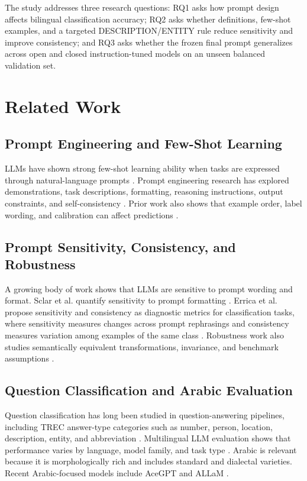 \documentclass[10pt,twocolumn]{article}
\begin{document}
The study addresses three research questions: RQ1 asks how prompt design affects bilingual classification accuracy; RQ2 asks whether definitions, few-shot examples, and a targeted DESCRIPTION/ENTITY rule reduce sensitivity and improve consistency; and RQ3 asks whether the frozen final prompt generalizes across open and closed instruction-tuned models on an unseen balanced validation set.
\section{Related Work}
\subsection{Prompt Engineering and Few-Shot Learning}
LLMs have shown strong few-shot learning ability when tasks are expressed through natural-language prompts \cite{brown2020language}. Prompt engineering research has explored demonstrations, task descriptions, formatting, reasoning instructions, output constraints, and self-consistency \cite{wei2022chain,kojima2022large,sahoo2024survey,white2023prompt,wang2023selfconsistency}. Prior work also shows that example order, label wording, and calibration can affect predictions \cite{zhao2021calibrate,lu2022fantastically}.
\subsection{Prompt Sensitivity, Consistency, and Robustness}
A growing body of work shows that LLMs are sensitive to prompt wording and format. Sclar et al. quantify sensitivity to prompt formatting \cite{sclar2024quantifying}. Errica et al. propose sensitivity and consistency as diagnostic metrics for classification tasks, where sensitivity measures changes across prompt rephrasings and consistency measures variation among examples of the same class \cite{errica2025wrong}. Robustness work also studies semantically equivalent transformations, invariance, and benchmark assumptions \cite{liang2023helm,ailem2024robustness}.
\subsection{Question Classification and Arabic Evaluation}
Question classification has long been studied in question-answering pipelines, including TREC answer-type categories such as number, person, location, description, entity, and abbreviation \cite{voorhees2000building,li2002learning}. Multilingual LLM evaluation shows that performance varies by language, model family, and task type \cite{hendrycks2021mmlu,huang2023ceval}. Arabic is relevant because it is morphologically rich and includes standard and dialectal varieties. Recent Arabic-focused models include AceGPT and ALLaM \cite{huang2024acegpt,humain2025allam}.
\end{document}
